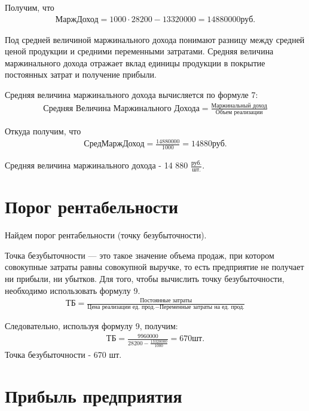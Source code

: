 Получим, что 
\begin{align}\text{МаржДоход} = 1 000 \cdot 28 200 - 13 320 000 = 14880000 \text {руб.}
\end{align}

Под средней величиной маржинального дохода понимают разницу между средней ценой продукции и средними переменными затратами. Средняя величина маржинального дохода отражает вклад единицы продукции в покрытие постоянных затрат и получение прибыли.

Средняя величина маржинального дохода вычисляется по формуле 7:
\begin{align}\text{Средняя Величина Маржинального Дохода}=\frac{\text{Маржинальный доход}}{\text{Объем реализации}} \end{align}

Откуда получим, что 
\begin{align}\text{СредМаржДоход} = \frac{14880000}{1000} = 14880 \text {руб.}
\end{align}

Средняя величина маржинального дохода - 14 880	 $\frac{\text{руб.}}{\text{шт.}}$.

\newpage
\section*{Порог рентабельности}

Найдем порог рентабельности (точку безубыточности).

Точка безубыточности — это такое значение объема продаж, при котором
совокупные затраты равны совокупной выручке, то есть предприятие не
получает ни прибыли, ни убытков.
Для того, чтобы вычислить точку безубыточности, необходимо использовать
формулу 9.
\begin{align}\text{ТБ}=\frac{\text{Постоянные затраты}}{\text{Цена реализации ед. прод.}- \text{Переменные затраты на ед. прод.}} \end{align}

Следовательно, используя формулу 9, получим:
\begin{align}\text{ТБ}=\frac{
9 960 000}{28200 - \frac{13 320 000}{1000}} =670\text{шт.
}
\end{align}
Точка безубыточности - 670 шт.

\newpage
\section*{Прибыль предприятия}

